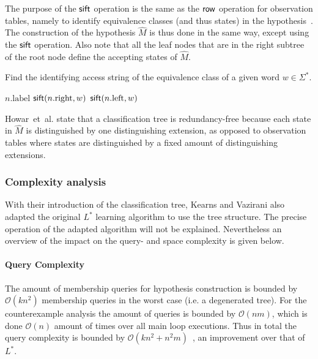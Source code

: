 \documentclass[multi,crop=false,class=article]{standalone}
\begin{document}
The purpose of the $\mathsf{sift}$ operation is the same as the $\mathsf{row}$ operation for
observation tables, namely to identify equivalence classes (and thus states) in
the hypothesis~\cite{Kearns1994}. The construction of the hypothesis $\hat M$ is
thus done in the same way, except using the $\mathsf{sift}$ operation. Also note that
all the leaf nodes that are in the right subtree of the root node define the
accepting states of $\hat M$.

\begin{algorithm}[b]
  \caption{Find the identifying access string of the equivalence class of a
    given word $w \in \Sigma^*$.}
  \label{alg:sift}
  \begin{algorithmic}[1]
     
        \State\Return $n.\text{label}$
      \EndIf
        \State $\mathsf{sift}(n.\text{right},w)$
      \Else
        \State $\mathsf{sift}(n.\text{left},w)$
      \EndIf
    \EndFunction{}
  \end{algorithmic}
\end{algorithm}

Howar~et~al. state that a classification tree is redundancy-free because each
state in $\hat M$ is distinguished by one distinguishing extension, as opposed
to observation tables where states are distinguished by a fixed amount of
distinguishing extensions\cite{Howar2014}.

\subsubsection{Complexity analysis}
\label{sec:complexity-analysis}
With their introduction of the classification tree, Kearns and Vazirani also
adapted the original $L^*$ learning algorithm to use the tree
structure\cite{Kearns1994}. The precise operation of the adapted algorithm will
not be explained. Nevertheless an overview of the impact on the query- and space
complexity is given below.

\paragraph{Query Complexity} The amount of membership queries for hypothesis
construction is bounded by $\mathcal{O}(kn^2)$ membership queries in the worst
case (i.e. a degenerated tree)\cite{Howar2014,Kearns1994,Isberner2014b}. For the
counterexample analysis the amount of queries is bounded by $\mathcal{O}(nm)$,
which is done $\mathcal{O}(n)$ amount of times over all main loop
executions\cite{Kearns1994}. Thus in total the query complexity is bounded by
$\mathcal{O}(kn^2 + n^2m)$~\cite{Isberner2015a}, an improvement over that of
$L^*$.
\end{document}
